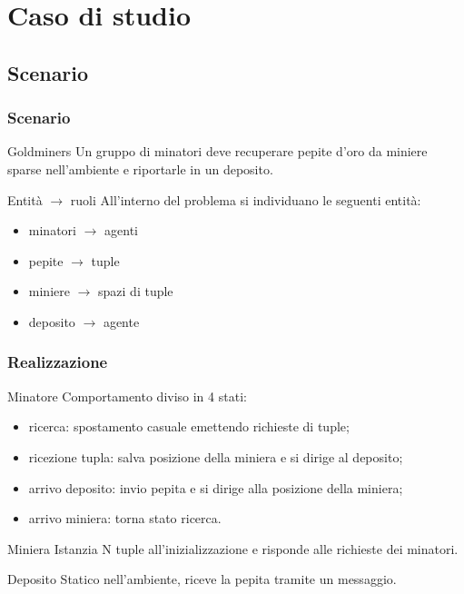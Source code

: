 \documentclass[handout]{beamer}\mode<presentation>{\usetheme{AMSCesenaBleu}}
\begin{document}
\section{Caso di studio}
\subsection{Scenario}
\begin{frame}
\frametitle{Scenario}
\begin{block}{Goldminers}
Un gruppo di minatori deve recuperare pepite d'oro da miniere sparse nell'ambiente e riportarle in un deposito.
\end{block}
\begin{block}{Entità $\rightarrow$ ruoli}
All'interno del problema si individuano le seguenti entità:
\begin{itemize}
\item \alert{minatori} $\rightarrow$ \alert{agenti}
\item pepite $\rightarrow$ tuple
\item \alert{miniere} $\rightarrow$ \alert{spazi di tuple}
\item deposito $\rightarrow$ agente
\end{itemize}
\end{block}
\end{frame}

\begin{frame}
\frametitle{Realizzazione}
\begin{block}{Minatore}
Comportamento diviso in 4 stati:
\begin{itemize}
\item \alert{ricerca}: spostamento casuale emettendo richieste di tuple;
\item \alert{ricezione tupla}: salva posizione della miniera e si dirige al deposito;
\item \alert{arrivo deposito}: invio pepita e si dirige alla posizione della miniera;
\item \alert{arrivo miniera}: torna stato ricerca. 
\end{itemize}
\end{block}
\begin{block}{Miniera}
Istanzia N tuple all'inizializzazione e risponde alle richieste dei minatori.
\end{block}
\begin{block}{Deposito}
Statico nell'ambiente, riceve la pepita tramite un messaggio.
\end{block}
\end{frame}
\end{document}
